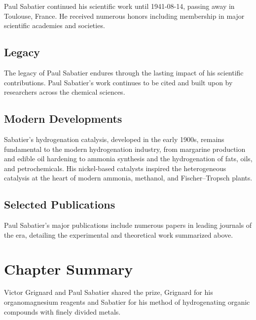 Paul Sabatier continued his scientific work until 1941-08-14, passing away in Toulouse, France.
He received numerous honors including membership in major scientific academies and societies.

\subsection*{Legacy}

The legacy of Paul Sabatier endures through the lasting impact of his scientific contributions.
Paul Sabatier's work continues to be cited and built upon by researchers across the chemical sciences.

\subsection*{Modern Developments}

Sabatier's hydrogenation catalysis, developed in the early 1900s, remains fundamental to the modern hydrogenation industry, from margarine production and edible oil hardening to ammonia synthesis and the hydrogenation of fats, oils, and petrochemicals. His nickel-based catalysts inspired the heterogeneous catalysis at the heart of modern ammonia, methanol, and Fischer–Tropsch plants.

\subsection*{Selected Publications}

Paul Sabatier's major publications include numerous papers in leading journals of the era, detailing the experimental and theoretical work summarized above.

\clearpage

\section*{Chapter Summary}

Victor Grignard and Paul Sabatier shared the prize, Grignard for his organomagnesium reagents and Sabatier for his method of hydrogenating organic compounds with finely divided metals.
